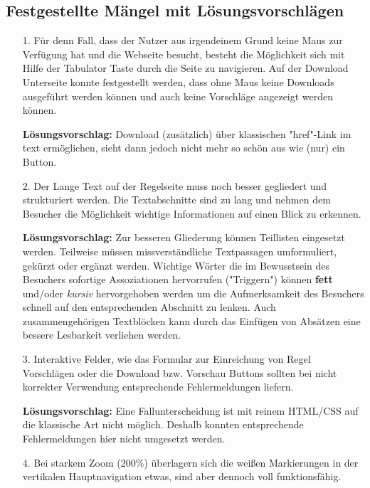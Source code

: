 \documentclass{scrartcl}
\begin{document}
\subsection{Festgestellte Mängel mit Lösungsvorschlägen}
\begin{itemize}

\item[1.]Für denn Fall, dass der Nutzer aus irgendeinem Grund keine Maus zur Verfügung hat und die Webseite besucht, besteht die Möglichkeit sich mit Hilfe der Tabulator Taste durch die Seite zu navigieren. Auf der Download Unterseite konnte festgestellt werden, dass ohne Maus keine Downloads ausgeführt werden können und auch keine Vorschläge angezeigt werden können.

\textbf{Lösungsvorschlag:} Download (zusätzlich) über klassischen "href"-Link im text ermöglichen, sieht dann jedoch nicht mehr so schön aus wie (nur) ein Button.

\item[2.]Der Lange Text auf der Regelseite muss noch besser gegliedert und strukturiert werden. Die Textabschnitte sind zu lang und nehmen dem Besucher die Möglichkeit wichtige Informationen auf einen Blick zu erkennen.

\textbf{Lösungsvorschlag:} Zur besseren Gliederung können Teillisten eingesetzt werden. Teilweise müssen missverständliche Textpassagen umformuliert, gekürzt oder ergänzt werden. Wichtige Wörter die im Bewusstsein des Besuchers sofortige Assoziationen hervorrufen ("Triggern") können \textbf{fett} und/oder \textit{kursiv} hervorgehoben werden um die Aufmerksamkeit des Besuchers schnell auf den entsprechenden Abschnitt zu lenken. Auch zusammengehörigen Textblöcken kann durch das Einfügen von Absätzen eine bessere Lesbarkeit verliehen werden.

\item[3.]Interaktive Felder, wie das Formular zur Einreichung von Regel Vorschlägen oder die Download bzw. Vorschau Buttons sollten bei nicht korrekter Verwendung entsprechende Fehlermeldungen liefern.

\textbf{Lösungsvorschlag:} Eine Fallunterscheidung ist mit reinem HTML/CSS auf die klassische Art nicht möglich. Deshalb konnten entsprechende Fehlermeldungen hier nicht umgesetzt werden.

\item[4.] Bei starkem Zoom (200\%) überlagern sich die weißen Markierungen in der vertikalen Hauptnavigation etwas, sind aber dennoch voll funktionsfähig. 


\end{itemize}
\end{document}
